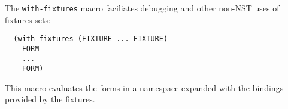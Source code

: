 % 
% 
% 
% 
% 

The \texttt{with-fixtures} macro faciliates debugging and other
non-NST uses of fixtures sets:
\begin{verbatim}
  (with-fixtures (FIXTURE ... FIXTURE)
    FORM
    ...
    FORM)
\end{verbatim}
This macro evaluates the forms in a namespace expanded with the
bindings provided by the fixtures.


